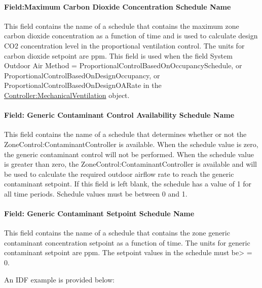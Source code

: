 \paragraph{Field:Maximum Carbon Dioxide Concentration Schedule Name}\label{fieldmaximum-carbon-dioxide-concentration-schedule-name}

This field contains the name of a schedule that contains the maximum zone carbon dioxide concentration as a function of time and is used to calculate design CO2 concentration level in the proportional ventilation control. The units for carbon dioxide setpoint are ppm. This field is used when the field System Outdoor Air Method = ProportionalControlBasedOnOccupancySchedule, or ProportionalControlBasedOnDesignOccupancy, or ProportionalControlBasedOnDesignOARate in the \hyperref[controllermechanicalventilation]{Controller:MechanicalVentilation} object.

\paragraph{Field: Generic Contaminant Control Availability Schedule Name}\label{field-generic-contaminant-control-availability-schedule-name}

This field contains the name of a schedule that determines whether or not the ZoneControl:ContaminantController is available. When the schedule value is zero, the generic contaminant control will not be performed. When the schedule value is greater than zero, the ZoneControl:ContaminantController is available and will be used to calculate the required outdoor airflow rate to reach the generic contaminant setpoint. If this field is left blank, the schedule has a value of 1 for all time periods. Schedule values must be between 0 and 1.

\paragraph{Field: Generic Contaminant Setpoint Schedule Name}\label{field-generic-contaminant-setpoint-schedule-name}

This field contains the name of a schedule that contains the zone generic contaminant concentration setpoint as a function of time. The units for generic contaminant setpoint are ppm. The setpoint values in the schedule must be\textgreater{} = 0.

An IDF example is provided below:


